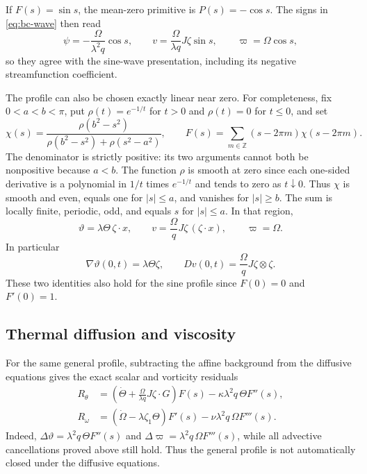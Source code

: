 If $F(s)=\sin s$, the mean-zero primitive is $P(s)=-\cos s$.
The signs in \eqref{eq:bc-wave} then read
\[
\psi=-\frac{\Omega}{\lambda^2q}\cos s,\qquad
v=\frac{\Omega}{\lambda q}J\zeta\sin s,\qquad
\varpi=\Omega\cos s,
\]
so they agree with the sine-wave presentation, including its negative
streamfunction coefficient.

The profile can also be chosen exactly linear near zero. For completeness,
fix $0<a<b<\pi$, put $\rho(t)=e^{-1/t}$ for $t>0$ and $\rho(t)=0$
for $t\leq0$, and set
\[
\chi(s)=\frac{\rho(b^2-s^2)}
{\rho(b^2-s^2)+\rho(s^2-a^2)},\qquad
F(s)=\sum_{m\in\mathbb Z}(s-2\pi m)\chi(s-2\pi m).
\]
The denominator is strictly positive: its two arguments cannot both be
nonpositive because $a<b$. The function $\rho$ is smooth at zero
since each one-sided derivative is a polynomial in $1/t$ times
$e^{-1/t}$ and tends to zero as $t\downarrow0$.
Thus $\chi$ is smooth and even, equals one for $|s|\leq a$, and
vanishes for $|s|\geq b$. The sum is locally finite, periodic, odd,
and equals $s$ for $|s|\leq a$. In that region,
\[
\vartheta=\lambda\Theta\,\zeta\cdot x,\qquad
v=\frac{\Omega}{q}J\zeta\,(\zeta\cdot x),\qquad \varpi=\Omega.
\]
In particular
\begin{equation}
\nabla\vartheta(0,t)=\lambda\Theta\zeta,\qquad
Dv(0,t)=\frac{\Omega}{q}J\zeta\otimes\zeta.
\label{eq:bc-central-gradient}
\end{equation}
These two identities also hold for the sine profile since
$F(0)=0$ and $F'(0)=1$.

\subsection{Thermal diffusion and viscosity}

For the same general profile, subtracting the affine background from
the diffusive equations gives the exact scalar and vorticity residuals
\begin{align}
R_\theta&=
\left(\dot\Theta+\frac{\Omega}{\lambda q}J\zeta\cdot G\right)F(s)
-\kappa\lambda^2q\,\Theta F''(s),\label{eq:bc-general-diffusion-scalar}\\
R_\omega&=(\dot\Omega-\lambda\zeta_1\Theta)F'(s)
-\nu\lambda^2q\,\Omega F'''(s).
\label{eq:bc-general-diffusion-vorticity}
\end{align}
Indeed, $\Delta\vartheta=\lambda^2q\,\Theta F''(s)$ and
$\Delta\varpi=\lambda^2q\,\Omega F'''(s)$, while all advective
cancellations proved above still hold. Thus the general profile is
not automatically closed under the diffusive equations.

